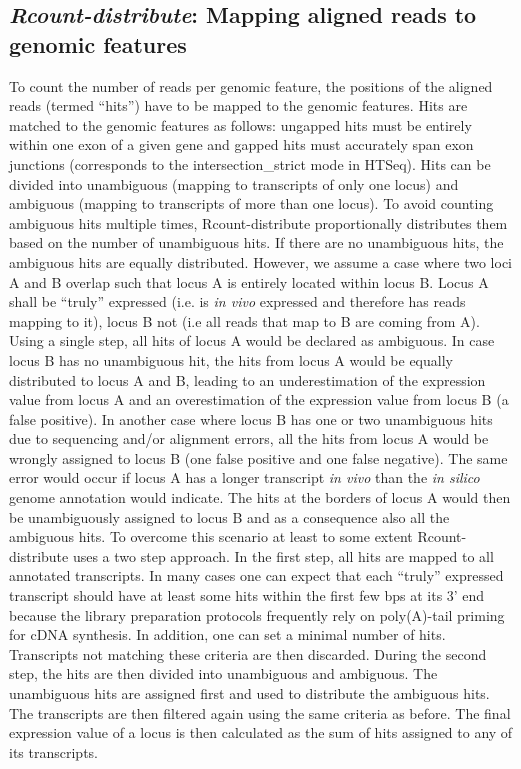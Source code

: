 \documentclass[a4paper,10pt]{article}
\begin{document}
\subsection{\textit{Rcount-distribute}: Mapping aligned reads to genomic features}
To count the number of reads per genomic feature, the positions of the aligned reads (termed ``hits'') have to be mapped to the genomic features. Hits are matched to the genomic features as follows: ungapped hits must be entirely within one exon of a given gene and gapped hits must accurately span exon junctions (corresponds to the intersection\_strict mode in HTSeq). Hits can be divided into unambiguous (mapping to transcripts of only one locus) and ambiguous (mapping to transcripts of more than one locus). To avoid counting ambiguous hits multiple times, Rcount-distribute proportionally distributes them based on the number of unambiguous hits. If there are no unambiguous hits, the ambiguous hits are equally distributed. However, we assume a case where two loci A and B overlap such that locus A is entirely located within locus B. Locus A shall be ``truly'' expressed (i.e. is \textit{in vivo} expressed and therefore has reads mapping to it), locus B not (i.e all reads that map to B are coming from A). Using a single step, all hits of locus A would be declared as ambiguous. In case locus B has no unambiguous hit, the hits from locus A would be equally distributed to locus A and B, leading to an underestimation of the expression value from locus A and an overestimation of the expression value from locus B (a false positive). In another case where locus B has one or two unambiguous hits due to sequencing and/or alignment errors, all the hits from locus A would be wrongly assigned to locus B (one false positive and one false negative). The same error would occur if locus A has a longer transcript \textit{in vivo} than the \textit{in silico} genome annotation would indicate. The hits at the borders of locus A would then be unambiguously assigned to locus B and as a consequence also all the ambiguous hits. To overcome this scenario at least to some extent Rcount-distribute uses a two step approach. In the first step, all hits are mapped to all annotated transcripts. In many cases one can expect that each ``truly'' expressed transcript should have at least some hits within the first few bps at its 3' end because the library preparation protocols frequently rely on poly(A)-tail priming for cDNA synthesis. In addition, one can set a minimal number of hits. Transcripts not matching these criteria are then discarded. During the second step, the hits are then divided into unambiguous and ambiguous. The unambiguous hits are assigned first and used to distribute the ambiguous hits. The transcripts are then filtered again using the same criteria as before. The final expression value of a locus is then calculated as the sum of hits assigned to any of its transcripts.
\end{document}
